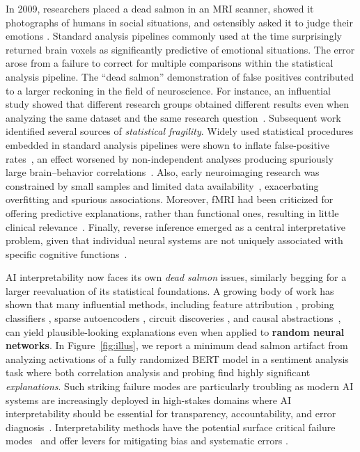 In 2009, researchers placed a dead salmon in an MRI scanner, showed it photographs of humans in social situations, and ostensibly asked it to judge their emotions \citep{bennett2009neural}. Standard analysis pipelines commonly used at the time surprisingly returned brain voxels as significantly predictive of emotional situations. The error arose from a failure to correct for multiple comparisons within the statistical analysis pipeline. The “dead salmon” demonstration of false positives contributed to a larger reckoning in the field of neuroscience. For instance, an influential study showed that different research groups obtained different results even when analyzing the same dataset and the same research question~\citep{botvinik2020variability}. 
Subsequent work identified several sources of \textit{statistical fragility}. Widely used statistical procedures embedded in standard analysis pipelines were shown to inflate false-positive rates~\citep{eklund2016cluster}, an effect worsened by non-independent analyses producing spuriously large brain–behavior correlations~\citep{vul2009voodoo}. Also, early neuroimaging research was constrained by small samples and limited data availability~\citep{button2013power,marek2022reproducible}, exacerbating overfitting and spurious associations. Moreover, fMRI had been criticized for offering predictive explanations, rather than functional ones, resulting in little clinical relevance~\citep{lyon2017dead}. Finally, reverse inference emerged as a central interpretative problem, given that individual neural systems are not uniquely associated with specific cognitive functions~\citep{poldrack2006can,duncan2000common}. 

AI interpretability now faces its own \textit{dead salmon} issues, similarly begging for a larger reevaluation of its statistical foundations. A growing body of work has shown that many influential methods, including feature attribution \citep{adebayo2018sanity}, probing classifiers \citep{ravichander-etal-2021-probing}, sparse autoencoders \citep{heap2025sparseautoencodersinterpretrandomly}, circuit discoveries \citep{melouxeverything}, and causal abstractions~\citep{sutter2025nonlinearrepresentationdilemmacausal}, can yield plausible-looking explanations even when applied to \textbf{random neural networks}. In Figure~\ref{fig:illus}, we report a minimum dead salmon artifact from analyzing activations of a fully randomized BERT model in a sentiment analysis task where both correlation analysis and probing find highly significant \textit{explanations}. Such striking failure modes are particularly troubling as modern AI systems are increasingly deployed in high-stakes domains where AI interpretability should be essential for transparency, accountability, and error diagnosis~\citep{mehrabi2021survey,barnes2024navigating,ramachandram2025transparentaicaseinterpretability}. 
Interpretability methods have the potential surface critical failure modes~\citep{kim2017interpretable,zech2018variable,caruana2015intelligible,meng2022locating,monea2024glitchmatrixlocatingdetecting,nguyen2025deploying} and offer levers for mitigating bias and systematic errors \citep{arrieta2019explainableartificialintelligencexai,kristofik2025bias,lepori-etal-2025-racing}. 

